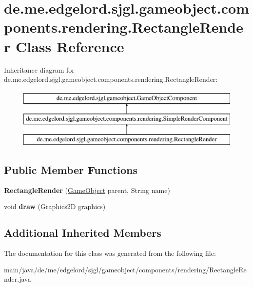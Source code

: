 \hypertarget{classde_1_1me_1_1edgelord_1_1sjgl_1_1gameobject_1_1components_1_1rendering_1_1_rectangle_render}{}\section{de.\+me.\+edgelord.\+sjgl.\+gameobject.\+components.\+rendering.\+Rectangle\+Render Class Reference}
\label{classde_1_1me_1_1edgelord_1_1sjgl_1_1gameobject_1_1components_1_1rendering_1_1_rectangle_render}
Inheritance diagram for de.\+me.\+edgelord.\+sjgl.\+gameobject.\+components.\+rendering.\+Rectangle\+Render\+:\begin{figure}[H]
\begin{center}
\leavevmode
\includegraphics[height=3.000000cm]{classde_1_1me_1_1edgelord_1_1sjgl_1_1gameobject_1_1components_1_1rendering_1_1_rectangle_render}
\end{center}
\end{figure}
\subsection*{Public Member Functions}
\begin{DoxyCompactItemize}
\item 
\mbox{\label{classde_1_1me_1_1edgelord_1_1sjgl_1_1gameobject_1_1components_1_1rendering_1_1_rectangle_render_a891badb1dc255e36405bac73981a46ea}} 
{\bfseries Rectangle\+Render} (\mbox{\hyperlink{classde_1_1me_1_1edgelord_1_1sjgl_1_1gameobject_1_1_game_object}{Game\+Object}} parent, String name)
\item 
\mbox{\label{classde_1_1me_1_1edgelord_1_1sjgl_1_1gameobject_1_1components_1_1rendering_1_1_rectangle_render_a2344750e904fdf4f5c0c84e79ffb15ad}} 
void {\bfseries draw} (Graphics2D graphics)
\end{DoxyCompactItemize}
\subsection*{Additional Inherited Members}


The documentation for this class was generated from the following file\+:\begin{DoxyCompactItemize}
\item 
main/java/de/me/edgelord/sjgl/gameobject/components/rendering/Rectangle\+Render.\+java\end{DoxyCompactItemize}
